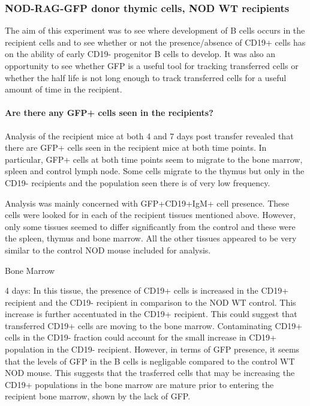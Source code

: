 



\subsubsection{NOD-RAG-GFP donor thymic cells, NOD WT recipients}

The aim of this experiment was to see where development of B cells occurs in the recipient cells and to see whether or not the presence/absence of CD19+ cells has on the ability of early CD19- progenitor B cells to develop.
It was also an opportunity to see whether GFP is a useful tool for tracking transferred cells or whether the half life is not long enough to track transferred cells for a useful amount of time in the recipient.

\paragraph{Are there any GFP+ cells seen in the recipients?}

Analysis of the recipient mice at both 4 and 7 days post transfer revealed that there are GFP+ cells seen in the recipient mice at both time points.
In particular, GFP+ cells at both time points seem to migrate to the bone marrow, spleen and control lymph node. 
Some cells migrate to the thymus but only in the CD19- recipients and the population seen there is of very low frequency.

Analysis was mainly concerned with GFP+CD19+IgM+ cell presence.
These cells were looked for in each of the recipient tissues mentioned above.
However, only some tissues seemed to differ significantly from the control and these were the spleen, thymus and bone marrow.
All the other tissues appeared to be very similar to the control NOD mouse included for analysis.

Bone Marrow

4 days:
In this tissue, the presence of CD19+ cells is increased in the CD19+ recipient and the CD19- recipient in comparison to the NOD WT control.
This increase is further accentuated in the CD19+ recipient.
This could suggest that transferred CD19+ cells are moving to the bone marrow.
Contaminating CD19+ cells in the CD19- fraction could account for the small increase in CD19+ population in the CD19- recipient.
However, in terms of GFP presence, it seems that the levels of GFP in the B cells is negligable compared to the control WT NOD mouse.
This suggests that the trasferred cells that may be increasing the CD19+ populations in the bone marrow are mature prior to entering the recipient bone marrow, shown by the lack of GFP.

